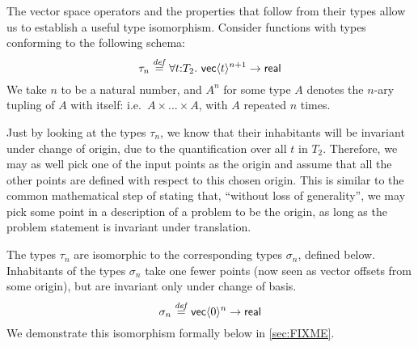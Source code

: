 \begin{example}
  The vector space operators and the properties that follow from their
  types allow us to establish a useful type isomorphism. Consider
  functions with types conforming to the following schema:
  \begin{displaymath}
    \tau_{n} \isDefinedAs \forall t\mathord:T_2.\ \mathsf{vec}\langle t \rangle^{n+1} \to \mathsf{real}
  \end{displaymath}
  We take $n$ to be a natural number, and $A^n$ for some type $A$
  denotes the $n$-ary tupling of $A$ with itself: i.e.~$A \times
  ... \times A$, with $A$ repeated $n$ times.

  Just by looking at the types $\tau_{n}$, we know that their
  inhabitants will be invariant under change of origin, due to the
  quantification over all $t$ in $T_2$. Therefore, we may as well pick
  one of the input points as the origin and assume that all the other
  points are defined with respect to this chosen origin. This is
  similar to the common mathematical step of stating that, ``without
  loss of generality'', we may pick some point in a description of a
  problem to be the origin, as long as the problem statement is
  invariant under translation.

  The types $\tau_{n}$ are isomorphic to the corresponding types
  $\sigma_{n}$, defined below. Inhabitants of the types
  $\sigma_{n}$ take one fewer points (now seen as vector offsets
  from some origin), but are invariant only under change of basis.
  \begin{displaymath}
    \sigma_{n} \stackrel{\mathit{def}}= \mathsf{vec}\langle 0 \rangle^n \to \mathsf{real}
  \end{displaymath}
  We demonstrate this isomorphism formally below in
  \autoref{sec:FIXME}.


\end{example}

